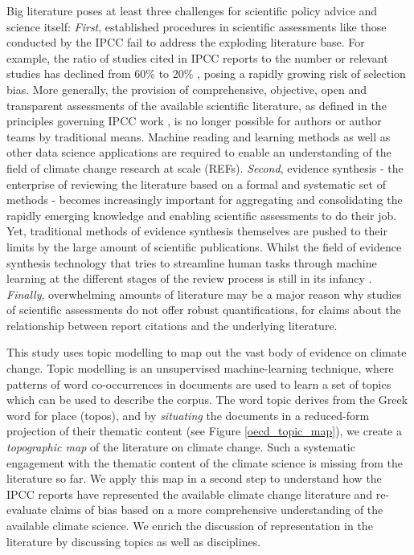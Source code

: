 \documentclass{article}
\begin{document}
\begin{linenumbers}
		Big literature poses at least three challenges for scientific policy advice and science itself: \emph{First}, established procedures in scientific assessments like those conducted by the IPCC fail to address the exploding literature base. For example, the ratio of studies cited in IPCC reports to the number or relevant studies has declined from 60\% to 20\%  \cite{Minx2017l}, posing a rapidly growing risk of selection bias. More generally, the provision of comprehensive, objective, open and transparent assessments of the available scientific literature, as defined in the principles governing IPCC work \cite{IPCC2013}, is no longer possible for authors or author teams by traditional means. Machine reading and learning methods as well as other data science applications are required to enable an understanding of the field of climate change research at scale (REFs). \emph{Second}, evidence synthesis - the enterprise of reviewing the literature based on a formal and systematic set of methods \cite{Chalmers2002} - becomes increasingly important for aggregating and consolidating the rapidly emerging knowledge and enabling scientific assessments to do their job. Yet, traditional methods of evidence synthesis themselves are pushed to their limits by the large amount of scientific publications. Whilst the field of evidence synthesis technology that tries to streamline human tasks through machine learning at the different stages of the review process is still in its infancy \cite{Beller2018}. \emph{Finally}, overwhelming amounts of literature may be a major reason why studies of scientific assessments \cite{Bjurström2011, Hulme2010, Victor2015, Corbera2016} do not offer robust quantifications, for claims about the relationship between report citations and the underlying literature. 
		
		This study uses topic modelling \cite{Blei2010} to map out the vast body of evidence on climate change. Topic modelling is an unsupervised machine-learning technique, where patterns of word co-occurrences in documents are used to learn a set of topics which can be used to describe the corpus. The word topic derives from the Greek word for place (topos), and by \textit{situating} the documents in a reduced-form projection of their thematic content (see Figure \ref{oecd_topic_map}), we create a \textit{topographic map} of the literature on climate change. Such a systematic engagement with the thematic content of the climate science is missing from the literature so far. 
		We apply this map in a second step to understand how the IPCC reports have represented the available climate change literature and re-evaluate claims of bias based on a more comprehensive understanding of the available climate science. We enrich the discussion of representation in the literature by discussing topics as well as disciplines. 
		

\end{linenumbers}
\end{document}
